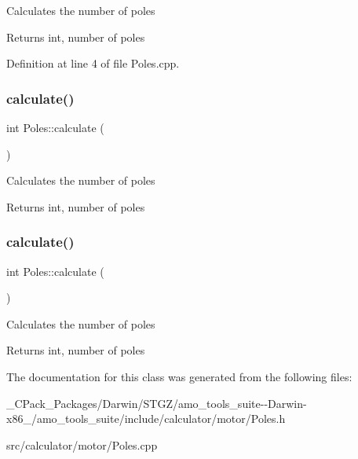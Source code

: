 Calculates the number of poles \begin{DoxyReturn}{Returns}
int, number of poles 
\end{DoxyReturn}


Definition at line 4 of file Poles.\+cpp.

\mbox{\label{class_poles_a23988f68100374c8277dca81ab06f724}} 
\subsubsection{\texorpdfstring{calculate()}{calculate()}\hspace{0.1cm}{\footnotesize\ttfamily [2/3]}}
{\footnotesize\ttfamily int Poles\+::calculate (\begin{DoxyParamCaption}{ }\end{DoxyParamCaption})}

Calculates the number of poles \begin{DoxyReturn}{Returns}
int, number of poles 
\end{DoxyReturn}
\mbox{\label{class_poles_a23988f68100374c8277dca81ab06f724}} 
\subsubsection{\texorpdfstring{calculate()}{calculate()}\hspace{0.1cm}{\footnotesize\ttfamily [3/3]}}
{\footnotesize\ttfamily int Poles\+::calculate (\begin{DoxyParamCaption}{ }\end{DoxyParamCaption})}

Calculates the number of poles \begin{DoxyReturn}{Returns}
int, number of poles 
\end{DoxyReturn}


The documentation for this class was generated from the following files\+:\begin{DoxyCompactItemize}
\item 
\+\_\+\+C\+Pack\+\_\+\+Packages/\+Darwin/\+S\+T\+G\+Z/amo\+\_\+tools\+\_\+suite-\/-\/\+Darwin-\/x86\+\_/amo\+\_\+tools\+\_\+suite/include/calculator/motor/Poles.\+h\item 
src/calculator/motor/Poles.\+cpp\end{DoxyCompactItemize}
